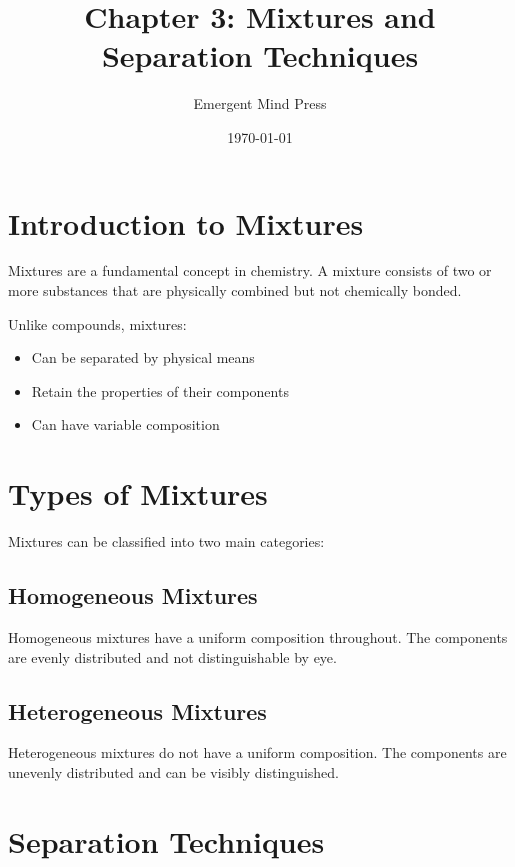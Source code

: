 \documentclass{article}
\title{Chapter 3: Mixtures and Separation Techniques}
\author{Emergent Mind Press}
\date{\today}
\begin{document}
\maketitle

\section{Introduction to Mixtures}

Mixtures are a fundamental concept in chemistry. A mixture consists of two or more substances that are physically combined but not chemically bonded.

\begin{tcolorbox}[colback=primary!5,colframe=primary,title=\textbf{Key Properties of Mixtures}]
Unlike compounds, mixtures:
\begin{itemize}
    \item Can be separated by physical means
    \item Retain the properties of their components
    \item Can have variable composition
\end{itemize}
\end{tcolorbox}

\section{Types of Mixtures}

Mixtures can be classified into two main categories:

\subsection{Homogeneous Mixtures}

Homogeneous mixtures have a uniform composition throughout. The components are evenly distributed and not distinguishable by eye.

\subsection{Heterogeneous Mixtures}

Heterogeneous mixtures do not have a uniform composition. The components are unevenly distributed and can be visibly distinguished.

\section{Separation Techniques}
\end{document}

